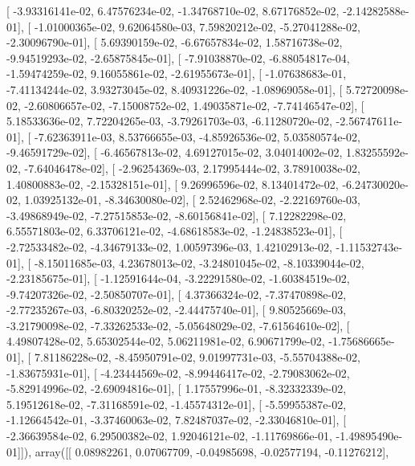 \documentclass{article}
\begin{document}
       [ -3.93316141e-02,   6.47576234e-02,  -1.34768710e-02,
          8.67176852e-02,  -2.14282588e-01],
       [ -1.01000365e-02,   9.62064580e-03,   7.59820212e-02,
         -5.27041288e-02,  -2.30096790e-01],
       [  5.69390159e-02,  -6.67657834e-02,   1.58716738e-02,
         -9.94519293e-02,  -2.65875845e-01],
       [ -7.91038870e-02,  -6.88054817e-04,  -1.59474259e-02,
          9.16055861e-02,  -2.61955673e-01],
       [ -1.07638683e-01,  -7.41134244e-02,   3.93273045e-02,
          8.40931226e-02,  -1.08969058e-01],
       [  5.72720098e-02,  -2.60806657e-02,  -7.15008752e-02,
          1.49035871e-02,  -7.74146547e-02],
       [  5.18533636e-02,   7.72204265e-03,  -3.79261703e-03,
         -6.11280720e-02,  -2.56747611e-01],
       [ -7.62363911e-03,   8.53766655e-03,  -4.85926536e-02,
          5.03580574e-02,  -9.46591729e-02],
       [ -6.46567813e-02,   4.69127015e-02,   3.04014002e-02,
          1.83255592e-02,  -7.64046478e-02],
       [ -2.96254369e-03,   2.17995444e-02,   3.78910038e-02,
          1.40800883e-02,  -2.15328151e-01],
       [  9.26996596e-02,   8.13401472e-02,  -6.24730020e-02,
          1.03925132e-01,  -8.34630080e-02],
       [  2.52462968e-02,  -2.22169760e-03,  -3.49868949e-02,
         -7.27515853e-02,  -8.60156841e-02],
       [  7.12282298e-02,   6.55571803e-02,   6.33706121e-02,
         -4.68618583e-02,  -1.24838523e-01],
       [ -2.72533482e-02,  -4.34679133e-02,   1.00597396e-03,
          1.42102913e-02,  -1.11532743e-01],
       [ -8.15011685e-03,   4.23678013e-02,  -3.24801045e-02,
         -8.10339044e-02,  -2.23185675e-01],
       [ -1.12591644e-04,  -3.22291580e-02,  -1.60384519e-02,
         -9.74207326e-02,  -2.50850707e-01],
       [  4.37366324e-02,  -7.37470898e-02,  -2.77235267e-03,
         -6.80320252e-02,  -2.44475740e-01],
       [  9.80525669e-03,  -3.21790098e-02,  -7.33262533e-02,
         -5.05648029e-02,  -7.61564610e-02],
       [  4.49807428e-02,   5.65302544e-02,   5.06211981e-02,
          6.90671799e-02,  -1.75686665e-01],
       [  7.81186228e-02,  -8.45950791e-02,   9.01997731e-03,
         -5.55704388e-02,  -1.83675931e-01],
       [ -4.23444569e-02,  -8.99446417e-02,  -2.79083062e-02,
         -5.82914996e-02,  -2.69094816e-01],
       [  1.17557996e-01,  -8.32332339e-02,   5.19512618e-02,
         -7.31168591e-02,  -1.45574312e-01],
       [ -5.59955387e-02,  -1.12664542e-01,  -3.37460063e-02,
          7.82487037e-02,  -2.33046810e-01],
       [ -2.36639584e-02,   6.29500382e-02,   1.92046121e-02,
         -1.11769866e-01,  -1.49895490e-01]]), array([[ 0.08982261,  0.07067709, -0.04985698, -0.02577194, -0.11276212],
\end{document}
